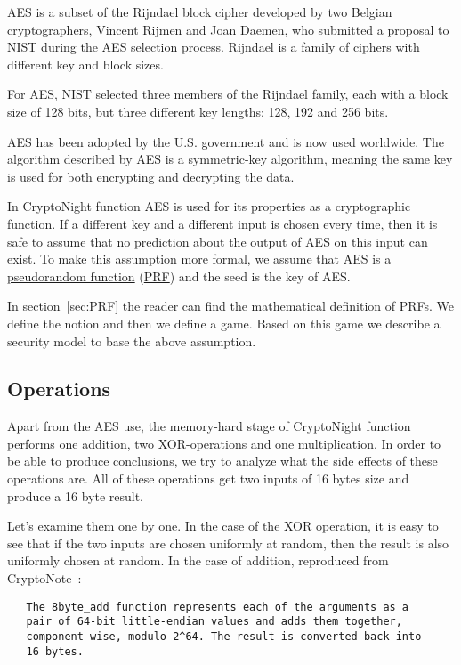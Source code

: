 AES is a subset of the Rijndael block cipher developed by two Belgian cryptographers, Vincent Rijmen and Joan Daemen, who submitted a proposal to NIST during the AES selection process. Rijndael is a family of ciphers with different key and block sizes.

For AES, NIST selected three members of the Rijndael family, each with a block size of 128 bits, but three different key lengths: 128, 192 and 256 bits.

AES has been adopted by the U.S. government and is now used worldwide. The algorithm described by AES is a symmetric-key algorithm, meaning the same key is used for both encrypting and decrypting the data.

In CryptoNight function AES is used for its properties as a cryptographic function. If a different key and a different input is chosen every time, then it is safe to assume that no prediction about the output of AES on this input can exist. To make this assumption more formal, we assume that AES is a \hyperref[sec:PRF]{pseudorandom function} (\hyperref[sec:PRF]{PRF}) and the seed is the key of AES.

In \hyperref[sec:PRF]{section}~\ref{sec:PRF} the reader can find the mathematical definition of PRFs. We define the notion and then we define a game. Based on this game we describe a security model to base the above assumption.

\subsection{Operations} \label{sec:operations}
Apart from the AES use, the memory-hard stage of CryptoNight function performs one addition, two XOR-operations and one multiplication. In order to be able to produce conclusions, we try to analyze what the side effects of these operations are. All of these operations get two inputs of 16 bytes size and produce a 16 byte result.

Let's examine them one by one. In the case of the XOR operation, it is easy to see that if the two inputs are chosen uniformly at random, then the result is also uniformly chosen at random. In the case of addition, reproduced from CryptoNote~\cite{cryptonight}:
\begin{verbatim}
   The 8byte_add function represents each of the arguments as a
   pair of 64-bit little-endian values and adds them together,
   component-wise, modulo 2^64. The result is converted back into
   16 bytes.
\end{verbatim}

